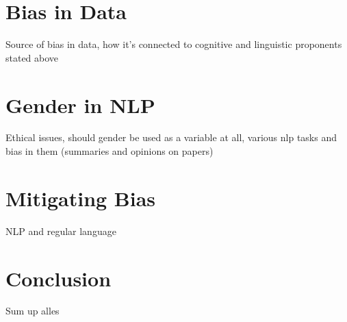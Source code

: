 \documentclass{article}
\begin{document}
\section{Bias in Data}
Source of bias in data, how it's connected to cognitive and linguistic proponents stated above

\section{Gender in NLP}
Ethical issues, should gender be used as a variable at all, various nlp tasks and bias in them (summaries and opinions on papers)

\section{Mitigating Bias}
NLP and regular language

\section{Conclusion}
Sum up alles

\printbibliography
\end{document}
